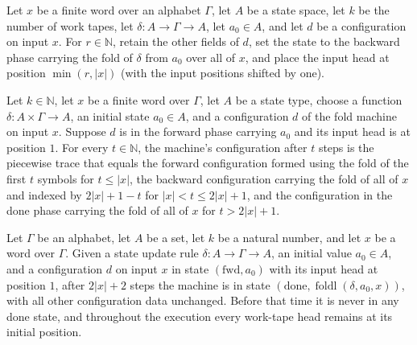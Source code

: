 \begin{definition}
\label{Turing.scanFoldR}
\leanok
{}
Let $x$ be a finite word over an alphabet $\Gamma$, let $A$ be a state space, let $k$ be
the number of work tapes, let $\delta:A\to\Gamma\to A$, let $a_0\in A$, and let $d$ be a
configuration on input $x$. For $r\in\mathbb{N}$, retain the other fields of $d$, set
the state to the backward phase carrying the fold of $\delta$ from $a_0$ over all of
$x$, and place the input head at position $\min(r,|x|)$ (with the input positions
shifted by one).
\end{definition}

\begin{theorem}
\label{Turing.scan_fold_trace}
\leanok
{}
Let $k\in\mathbb N$, let $x$ be a finite word over $\Gamma$, let $A$ be a state type,
choose a function $\delta:A\times\Gamma\to A$, an initial state $a_0\in A$, and a
configuration $d$ of the fold machine on input $x$. Suppose $d$ is in the forward phase
carrying $a_0$ and its input head is at position $1$. For every $t\in\mathbb N$, the
machine's configuration after $t$ steps is the piecewise trace that equals the forward
configuration formed using the fold of the first $t$ symbols for $t\le |x|$, the
backward configuration carrying the fold of all of $x$ and indexed by $2|x|+1-t$ for
$|x|<t\le 2|x|+1$, and the configuration in the done phase carrying the fold of all of
$x$ for $t>2|x|+1$.
\end{theorem}

\begin{theorem}
\label{Turing.inputFoldTM_run_ofCfg}
\leanok
{}
Let $\Gamma$ be an alphabet, let $A$ be a set, let $k$ be a natural number, and let $x$
be a word over $\Gamma$. Given a state update rule $\delta:A\to\Gamma\to A$, an initial
value $a_0\in A$, and a configuration $d$ on input $x$ in state $(\mathrm{fwd},a_0)$
with its input head at position $1$, after $2|x|+2$ steps the machine is in state
$(\mathrm{done},\operatorname{foldl}(\delta,a_0,x))$, with all other configuration data
unchanged. Before that time it is never in any done state, and throughout the execution
every work-tape head remains at its initial position.
\end{theorem}
